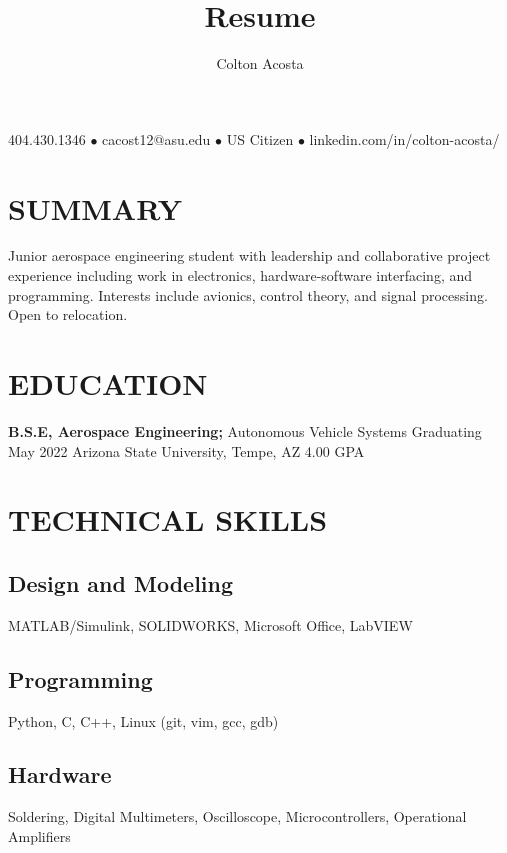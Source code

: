 \documentclass{article}
\makeatletter
\renewcommand{\maketitle}{
	\begin{center}
		{\huge\bfseries
			\theauthor}
			
		404.430.1346 $\bullet$ cacost12@asu.edu $\bullet$ US Citizen $\bullet$ linkedin.com/in/colton-acosta/
	\end{center}
}
\makeatother
\begin{document}
\title{Resume}
\author{Colton Acosta}
\maketitle
\section{SUMMARY}
Junior aerospace engineering student with leadership and collaborative project experience including work in electronics, hardware-software interfacing, and programming. Interests include avionics, control theory, and signal processing. Open to relocation.
\section{EDUCATION}
\textbf{B.S.E, Aerospace Engineering;} Autonomous Vehicle Systems
\hfill 
Graduating May 2022
\linebreak
Arizona State University, Tempe, AZ 
\hfill
4.00 GPA

\section{TECHNICAL SKILLS}
\subsection{Design and Modeling}
MATLAB/Simulink, SOLIDWORKS, Microsoft Office, LabVIEW
\subsection{Programming} 
Python, C, C++, Linux (git, vim, gcc, gdb)
\subsection{Hardware}
Soldering, Digital Multimeters, Oscilloscope, Microcontrollers, Operational Amplifiers
\end{document}
